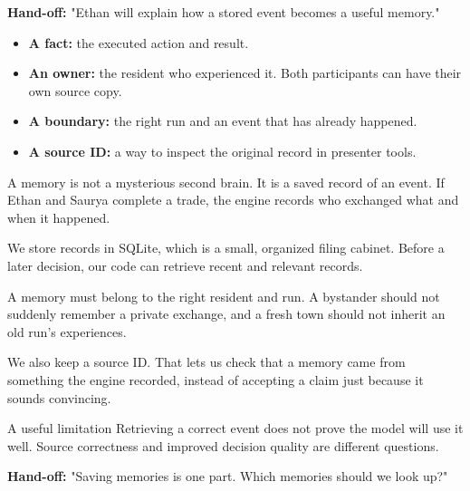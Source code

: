 \documentclass[11pt,a4paper]{article}
\newcommand{\pagehead}[3]{\clearpage{\color{forest}\small\ttfamily #1 \hfill #3}\par\vspace{3pt}{\LARGE\bfseries #2}\par\vspace{5pt}}
\newcommand{\subhead}[1]{\par\vspace{7pt}\noindent{\large\bfseries\color{forest}#1}\par\nobreak\vspace{2pt}}
\newcommand{\handoff}[1]{\vfill{\small\color{forest}\textbf{Hand-off:} #1}\par}
\begin{document}
\handoff{"Ethan will explain how a stored event becomes a useful memory."}

\pagehead{MEMORIES}{A notebook of things that actually happened}{Ethan}
\label{memories}
\begin{center}
\end{center}
\subhead{What a memory needs}
\begin{itemize}
\item \textbf{A fact:} the executed action and result.
\item \textbf{An owner:} the resident who experienced it. Both participants can have their own source copy.
\item \textbf{A boundary:} the right run and an event that has already happened.
\item \textbf{A source ID:} a way to inspect the original record in presenter tools.
\end{itemize}
\begin{saybox}
A memory is not a mysterious second brain. It is a saved record of an event. If Ethan and Saurya complete a trade, the engine records who exchanged what and when it happened.

We store records in SQLite, which is a small, organized filing cabinet. Before a later decision, our code can retrieve recent and relevant records.

A memory must belong to the right resident and run. A bystander should not suddenly remember a private exchange, and a fresh town should not inherit an old run's experiences.

We also keep a source ID. That lets us check that a memory came from something the engine recorded, instead of accepting a claim just because it sounds convincing.
\end{saybox}
\begin{notebox}{A useful limitation}
Retrieving a correct event does not prove the model will use it well. Source correctness and improved decision quality are different questions.
\end{notebox}
\handoff{"Saving memories is one part. Which memories should we look up?"}
\end{document}

